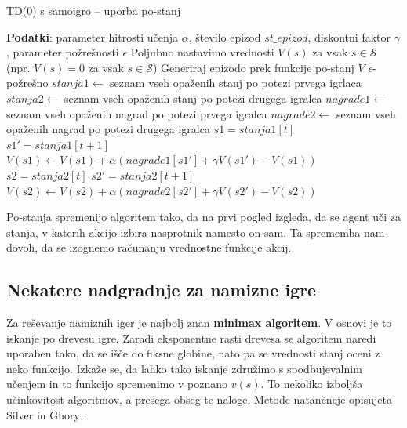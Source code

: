 \documentclass[12pt,a4paper]{amsart}
\theoremstyle{definition} %
\theoremstyle{plain} %
\begin{document}
\begin{algorithm}[H]
    \caption{TD($0$) s samoigro -- uporba po-stanj}
\begin{algorithmic}\label{samoigra}
    \STATE \textbf{Podatki}: parameter hitrosti učenja $\alpha$, število epizod $st\_epizod$, diskontni 
            faktor $\gamma$, parameter požrešnosti $\epsilon$
    \STATE 
    \STATE Poljubno nastavimo vrednosti $V(s)$ za vsak $s \in \mathcal{S}$ (npr. $V(s) = 0$ za vsak $s \in 
            \mathcal{S}$)
    \STATE
        \STATE Generiraj epizodo prek funkcije po-stanj $V$ $\epsilon$-požrešno
        \STATE $stanja1 \leftarrow$ seznam vseh opaženih stanj po potezi prvega igrlaca
        \STATE $stanja2 \leftarrow$ seznam vseh opaženih stanj po potezi drugega igralca
        \STATE $nagrade1 \leftarrow$ seznam vseh opaženih nagrad po potezi prvega igralca
        \STATE $nagrade2 \leftarrow$ seznam vseh opaženih nagrad po potezi drugega igralca
        \STATE
                \STATE $s1 = stanja1[t]$
                \STATE $s1' = stanja1[t + 1]$
                \STATE $V(s1) \leftarrow V(s1) + \alpha (nagrade1[s1'] + \gamma V(s1') - V(s1))$ 
            \ELSE
                \STATE $s2 = stanja2[t]$
                \STATE $s2' = stanja2[t + 1]$
                \STATE $V(s2) \leftarrow V(s2) + \alpha (nagrade2[s2'] + \gamma V(s2') - V(s2))$ 
            \ENDIF
        \ENDFOR
    \ENDFOR
\end{algorithmic}
\end{algorithm}

Po-stanja spremenijo algoritem tako, da na prvi pogled izgleda, da se agent uči za stanja, v katerih 
akcijo izbira nasprotnik namesto on sam. Ta sprememba nam dovoli, da se izognemo računanju vrednostne 
funkcije akcij.

\subsection{Nekatere nadgradnje za namizne igre}
Za reševanje namiznih iger je najbolj znan \textbf{minimax algoritem}. V osnovi je to iskanje po drevesu 
igre. Zaradi eksponentne rasti drevesa se algoritem naredi uporaben tako, da se išče do fiksne globine, 
nato pa se vrednosti stanj oceni z neko funkcijo. Izkaže se, da lahko tako iskanje združimo s 
spodbujevalnim učenjem in to funkcijo spremenimo v poznano $v(s)$. To nekoliko izboljša učinkovitost 
algoritmov, a presega obseg te naloge. Metode natančneje opisujeta Silver \cite{LecNotesSilver} in 
Ghory \cite{RLboard}.
\end{document}
